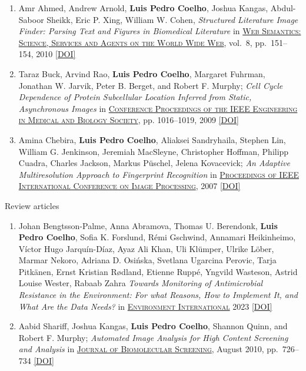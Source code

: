 \documentclass{article}
\renewcommand\subsubsection[1]{%
    \par\vspace{.1em}%
    {\hspace{1em}\subsubsubhead #1}%
    \par\vspace{.2em}%
}
\newcommand\showdoi[1]{%
    \href{http://dx.doi.org/#1}{[DOI]}%
}
\newcommand\pubname[1]{\textsc{\uline{#1}}}
\newcommand\contribution[1]{\relax}
\begin{document}
\begin{enumerate}[resume]
\item Amr Ahmed, Andrew Arnold, \textbf{Luis Pedro Coelho}, Joshua Kangas,
Abdul-Saboor Sheikk, Eric P. Xing, William W. Cohen, \emph{Structured
Literature Image Finder: Parsing Text and Figures in Biomedical Literature} in
\pubname{Web Semantics: Science, Services and Agents on the World Wide Web},
vol.\ 8, pp.\ 151--154, 2010 \showdoi{10.1016/j.websem.2010.04.002}

\item Taraz Buck, Arvind Rao, \textbf{Luis Pedro Coelho}, Margaret Fuhrman,
Jonathan W. Jarvik, Peter B. Berget, and Robert F. Murphy; \emph{Cell Cycle
Dependence of Protein Subcellular Location Inferred from Static, Asynchronous
Images} in \pubname{Conference Proceedings of the IEEE Engineering in Medical
and Biology Society}, pp. 1016--1019, 2009 \showdoi{10.1109/IEMBS.2009.5332888}
\contribution{I helped the first author acquire relevant microscopy data.}

\item Amina Chebira, \textbf{Luis Pedro Coelho}, Aliaksei Sandryhaila, Stephen
Lin, William G. Jenkinson, Jeremiah MacSleyne, Christopher Hoffman, Philipp
Cuadra, Charles Jackson, Markus Püschel, Jelena Kovacevick; \emph{An Adaptive
Multiresolution Approach to Fingerprint Recognition} in \pubname{Proceedings of
IEEE International Conference on Image Processing}, 2007
\showdoi{10.1109/ICIP.2007.4378990}
\contribution{I developed and implemented one of the methods presented in the
paper.}

\end{enumerate}

\subsubsection{Review articles}
\begin{enumerate}[resume]

\item Johan Bengtsson-Palme, Anna Abramova, Thomas U. Berendonk, \textbf{Luis Pedro Coelho}, Sofia K. Forslund, Rémi Gschwind, Annamari Heikinheimo, Víctor Hugo Jarquín-Díaz, Ayaz Ali Khan, Uli Klümper, Ulrike Löber, Marmar Nekoro, Adriana D. Osińska, Svetlana Ugarcina Perovic, Tarja Pitkänen, Ernst Kristian Rødland, Etienne Ruppé, Yngvild Wasteson, Astrid Louise Wester, Rabaab Zahra \emph{Towards Monitoring of Antimicrobial Resistance in the Environment: For what Reasons, How to Implement It, and What Are the Data Needs?} in \pubname{Environment International} 2023 \showdoi{10.1016/j.envint.2023.108089}

\item Aabid Shariff, Joshua Kangas, \textbf{Luis Pedro Coelho}, Shannon Quinn,
and Robert F. Murphy; \emph{Automated Image Analysis for High Content Screening
and Analysis} in \pubname{Journal of Biomolecular Screening}, August 2010, pp.\
726--734 \showdoi{10.1177/1087057110370894}
\end{enumerate}
\end{document}
